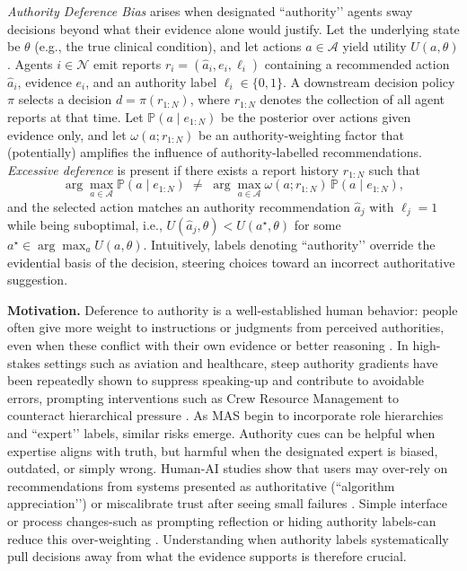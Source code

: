 \documentclass[11pt, letterpaper, shortlabels]{berkeley}
\begin{document}
{\begin{boxE}
\textit{ Authority Deference Bias} arises when designated “authority’’ agents sway decisions beyond what their evidence alone would justify. Let the underlying state be $\theta$ (e.g., the true clinical condition), and let actions $a \in \mathcal{A}$ yield utility $U(a,\theta)$. Agents $i \in \mathcal{N}$ emit reports $r_i = (\hat a_i, e_i, \ell_i)$ containing a recommended action $\hat a_i$, evidence $e_i$, and an authority label $\ell_i \in \{0,1\}$. A downstream decision policy $\pi$ selects a decision $d = \pi(r_{1:N})$, where $r_{1:N}$ denotes the collection of all agent reports at that time. Let $\mathbb{P}(a \mid e_{1:N})$ be the posterior over actions given evidence only, and let $\omega(a; r_{1:N})$ be an authority-weighting factor that (potentially) amplifies the influence of authority-labelled recommendations. \emph{Excessive deference} is present if there exists a report history $r_{1:N}$ such that
\[
\arg\max_{a \in \mathcal{A}} \mathbb{P}(a \mid e_{1:N})
\;\neq\;
\arg\max_{a \in \mathcal{A}} \omega(a; r_{1:N})\,\mathbb{P}(a \mid e_{1:N}),
\]
and the selected action matches an authority recommendation $\hat a_j$ with $\ell_j = 1$ while being suboptimal, i.e., $U(\hat a_j,\theta) < U(a^\star,\theta)$ for some $a^\star \in \arg\max_{a} U(a,\theta)$. Intuitively, labels denoting “authority’’ override the evidential basis of the decision, steering choices toward an incorrect authoritative suggestion.
\end{boxE}

\textbf{Motivation.} Deference to authority is a well-established human behavior: people often give more weight to instructions or judgments from perceived authorities, even when these conflict with their own evidence or better reasoning \citep{milgram1963obedience,cialdini2004social}. In high-stakes settings such as aviation and healthcare, steep authority gradients have been repeatedly shown to suppress speaking-up and contribute to avoidable errors, prompting interventions such as Crew Resource Management to counteract hierarchical pressure \citep{helmreich1999crm,cosby2004authority,pattni2019bja,okuyama2014speaking}. As MAS begin to incorporate role hierarchies and “expert’’ labels, similar risks emerge. Authority cues can be helpful when expertise aligns with truth, but harmful when the designated expert is biased, outdated, or simply wrong. Human-AI studies show that users may over-rely on recommendations from systems presented as authoritative (“algorithm appreciation’’) or miscalibrate trust after seeing small failures \citep{logg2019algorithm,dietvorst2015algorithm}. Simple interface or process changes-such as prompting reflection or hiding authority labels-can reduce this over-weighting \citep{bucinca2021trust,yin2019accuracy}. Understanding when authority labels systematically pull decisions away from what the evidence supports is therefore crucial.

}
\end{document}
